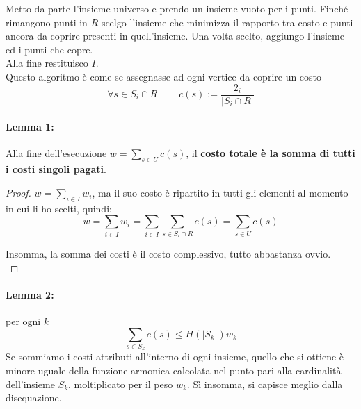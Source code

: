 Metto da parte l'insieme universo e prendo un insieme vuoto per i punti. Finché rimangono punti in $R$ scelgo l'insieme che minimizza il rapporto tra costo e punti ancora da coprire presenti in quell'insieme. Una volta scelto, aggiungo l'insieme ed i punti che copre.\\
Alla fine restituisco $I$.\\

Questo algoritmo è come se assegnasse ad ogni vertice da coprire un costo
$$\forall s \in S_i \cap R \;\;\;\;\;\;\;\; c(s) := \frac{2_i}{|S_i \cap R|}$$

\newpage

\paragraph{Lemma 1:} Alla fine dell'esecuzione $w = \sum_{s \in U} c(s)$, il \textbf{costo totale è la somma di tutti i costi singoli pagati}.\\

\begin{proof}
	$w = \sum_{i \in I} w_i$, ma il suo costo è ripartito in tutti gli elementi al momento in cui li ho scelti, quindi: 
	$$ w = \sum_{i \in I} w_i = \sum_{i \in I} \sum_{s \in S_i \cap R} c(s) = \sum_{s \in U} c(s) $$
	
	Insomma, la somma dei costi è il costo complessivo, tutto abbastanza ovvio.\\
\end{proof}

\paragraph{Lemma 2:} per ogni $k$ 
$$ \sum_{s \in S_k} c(s) \leq H(|S_k|) w_k $$
Se sommiamo i costi attributi all'interno di ogni insieme, quello che si ottiene è minore uguale della funzione armonica calcolata nel punto pari alla cardinalità dell'insieme $S_k$, moltiplicato per il peso $w_k$. Sì insomma, si capisce meglio dalla disequazione.\\

